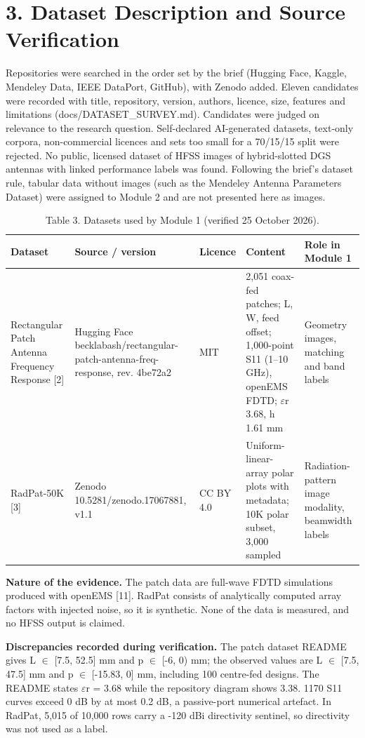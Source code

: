 \documentclass[11pt,a4paper]{article}
\begin{document}
\section*{3. Dataset Description and Source Verification}
Repositories were searched in the order set by the brief (Hugging Face, Kaggle, Mendeley Data, IEEE DataPort, GitHub), with Zenodo added. Eleven candidates were recorded with title, repository, version, authors, licence, size, features and limitations (docs/DATASET\_SURVEY.md). Candidates were judged on relevance to the research question. Self-declared AI-generated datasets, text-only corpora, non-commercial licences and sets too small for a 70/15/15 split were rejected. No public, licensed dataset of HFSS images of hybrid-slotted DGS antennas with linked performance labels was found. Following the brief's dataset rule, tabular data without images (such as the Mendeley Antenna Parameters Dataset) were assigned to Module 2 and are not presented here as images.

\begin{table}[H]\centering\small
\caption*{Table 3. Datasets used by Module 1 (verified 25 October 2026).}
\begin{tabularx}{\linewidth}{XXXXX}
\toprule
\textbf{Dataset} & \textbf{Source / version} & \textbf{Licence} & \textbf{Content} & \textbf{Role in Module 1} \\
\midrule
Rectangular Patch Antenna Frequency Response [2] & Hugging Face becklabash/rectangular-patch-antenna-freq-response, rev. 4be72a2 & MIT & 2,051 coax-fed patches; L, W, feed offset; 1,000-point S11 (1--10 GHz), openEMS FDTD; $\varepsilon$r 3.68, h 1.61 mm & Geometry images, matching and band labels \\
RadPat-50K [3] & Zenodo 10.5281/zenodo.17067881, v1.1 & CC BY 4.0 & Uniform-linear-array polar plots with metadata; 10K polar subset, 3,000 sampled & Radiation-pattern image modality, beamwidth labels \\
\bottomrule
\end{tabularx}
\end{table}
\textbf{Nature of the evidence.} The patch data are full-wave FDTD simulations produced with openEMS [11]. RadPat consists of analytically computed array factors with injected noise, so it is synthetic. None of the data is measured, and no HFSS output is claimed.

\textbf{Discrepancies recorded during verification.} The patch dataset README gives L $\in$ [7.5, 52.5] mm and p $\in$ [-6, 0) mm; the observed values are L $\in$ [7.5, 47.5] mm and p $\in$ [-15.83, 0] mm, including 100 centre-fed designs. The README states $\varepsilon$r = 3.68 while the repository diagram shows 3.38. 1170 S11 curves exceed 0 dB by at most 0.2 dB, a passive-port numerical artefact. In RadPat, 5,015 of 10,000 rows carry a -120 dBi directivity sentinel, so directivity was not used as a label.
\end{document}
